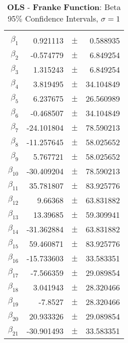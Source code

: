 \documentclass[...,numrefs]{wiley-article}
\begin{document}
\begin{table}[h]
    \centering
    \caption{$\textbf{OLS - Franke Function:}$ Beta 95$\%$ Confidence Intervals, $\sigma = 1$}
    \begin{tabular}{rrrr}
    \hline
    \\
    $\beta_{1}$ & 0.921113 & $\pm$ & 0.588935 \\
    $\beta_{2}$ & -0.574779 & $\pm$ & 6.849254 \\
    $\beta_{3}$ & 1.315243 & $\pm$ & 6.849254 \\
    $\beta_{4}$ & 3.819495 & $\pm$ & 34.104849 \\
    $\beta_{5}$ & 6.237675 & $\pm$ & 26.560989 \\
    $\beta_{6}$ & -0.468507 & $\pm$ & 34.104849 \\
    $\beta_{7}$ & -24.101804 & $\pm$ & 78.590213 \\
    $\beta_{8}$ & -11.257645 & $\pm$ & 58.025652 \\
    $\beta_{9}$ & 5.767721 & $\pm$ & 58.025652 \\
    $\beta_{10}$ & -30.409204 & $\pm$ & 78.590213 \\
    $\beta_{11}$ & 35.781807 & $\pm$ & 83.925776 \\
    $\beta_{12}$ & 9.66368 & $\pm$ & 63.831882 \\
    $\beta_{13}$ & 13.39685 & $\pm$ & 59.309941 \\
    $\beta_{14}$ & -31.362884 & $\pm$ & 63.831882 \\
    $\beta_{15}$ & 59.460871 & $\pm$ & 83.925776 \\
    $\beta_{16}$ & -15.733603 & $\pm$ & 33.583351 \\
    $\beta_{17}$ & -7.566359 & $\pm$ & 29.089854 \\
    $\beta_{18}$ & 3.041943 & $\pm$ & 28.320466 \\
    $\beta_{19}$ & -7.8527 & $\pm$ & 28.320466 \\
    $\beta_{20}$ & 20.933326 & $\pm$ & 29.089854 \\
    $\beta_{21}$ & -30.901493 & $\pm$ & 33.583351 \\
    \hline
    \end{tabular}

    \label{tab:my_label}
\end{table}
\end{document}
